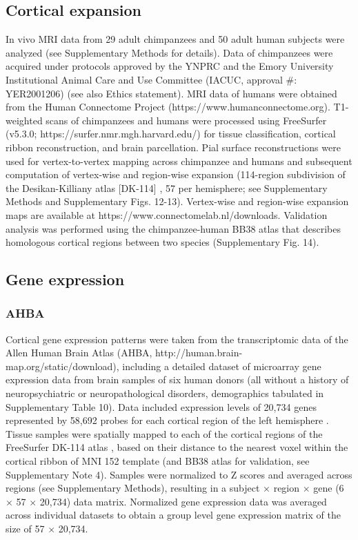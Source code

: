 \begin{refsection}
\subsection*{Cortical expansion}
In vivo MRI data from 29 adult chimpanzees and 50 adult human subjects were analyzed (see Supplementary Methods for details). Data of chimpanzees were acquired under protocols approved by the YNPRC and the Emory University Institutional Animal Care and Use Committee (IACUC, approval \#: YER2001206) (see also Ethics statement). MRI data of humans were obtained from the Human Connectome Project (https://www.humanconnectome.org). T1-weighted scans of chimpanzees and humans were processed using FreeSurfer (v5.3.0; https://surfer.nmr.mgh.harvard.edu/) for tissue classification, cortical ribbon reconstruction, and brain parcellation. Pial surface reconstructions were used for vertex-to-vertex mapping across chimpanzee and humans and subsequent computation of vertex-wise and region-wise expansion (114-region subdivision of the Desikan-Killiany atlas [DK-114] \citep{DESIKAN2006968,CAMMOUN2012386}, 57 per hemisphere; see Supplementary Methods and Supplementary Figs. 12-13). Vertex-wise and region-wise expansion maps are available at https://www.connectomelab.nl/downloads. Validation analysis was performed using the chimpanzee-human BB38 atlas that describes homologous cortical regions between two species \citep{Heuvel2019EvolutionaryMI} (Supplementary Fig. 14).

\subsection*{Gene expression}
\subsubsection*{AHBA}
Cortical gene expression patterns were taken from the transcriptomic data of the Allen Human Brain Atlas (AHBA, http://human.brain-map.org/static/download), including a detailed dataset of microarray gene expression data from brain samples of six human donors (all without a history of neuropsychiatric or neuropathological disorders, demographics tabulated in Supplementary Table 10). Data included expression levels of 20,734 genes represented by 58,692 probes for each cortical region of the left hemisphere \citep{Romme2017ConnectomeDA}. Tissue samples were spatially mapped to each of the cortical regions of the FreeSurfer DK-114 atlas \citep{DESIKAN2006968,CAMMOUN2012386}, based on their distance to the nearest voxel within the cortical ribbon of MNI 152 template (and BB38 atlas for validation, see Supplementary Note 4). Samples were normalized to Z scores and averaged across regions (see Supplementary Methods), resulting in a subject $\times$ region $\times$ gene (6 $\times$ 57 $\times$ 20,734) data matrix. Normalized gene expression data was averaged across individual datasets to obtain a group level gene expression matrix of the size of 57 $\times$ 20,734.


\end{refsection}
